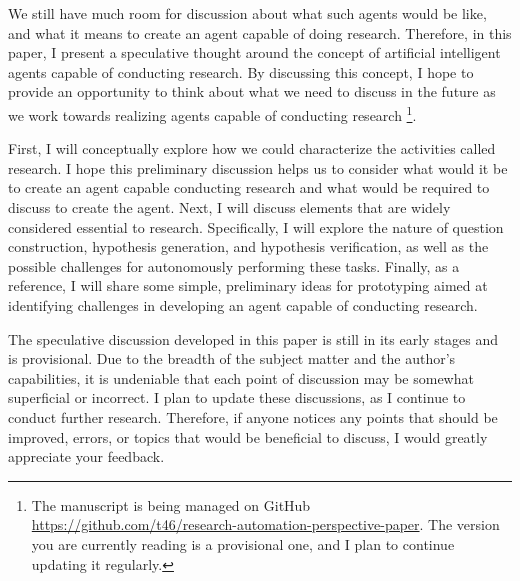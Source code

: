 We still have much room for discussion about what such agents would be like, and what it means to create an agent capable of doing research. Therefore, in this paper, I present a speculative thought around the concept of artificial intelligent agents capable of conducting research. By discussing this concept, I hope to provide an opportunity to think about what we need to discuss in the future as we work towards realizing agents capable of conducting research \footnote{
The manuscript is being managed on GitHub \url{https://github.com/t46/research-automation-perspective-paper}. The version you are currently reading is a provisional one, and I plan to continue updating it regularly.
}. 

First, I will conceptually explore how we could characterize the activities called research. I hope this preliminary discussion helps us to consider what would it be to create an agent capable conducting research and what would be required to discuss to create the agent. Next, I will discuss elements that are widely considered essential to research. Specifically, I will explore the nature of question construction, hypothesis generation, and hypothesis verification, as well as the possible challenges for autonomously performing these tasks. Finally, as a reference, I will share some simple, preliminary ideas for prototyping aimed at identifying challenges in developing an agent capable of conducting research.

The speculative discussion developed in this paper is still in its early stages and is provisional. Due to the breadth of the subject matter and the author's capabilities, it is undeniable that each point of discussion may be somewhat superficial or incorrect. I plan to update these discussions, as I continue to conduct further research. Therefore, if anyone notices any points that should be improved, errors, or topics that would be beneficial to discuss, I would greatly appreciate your feedback.
